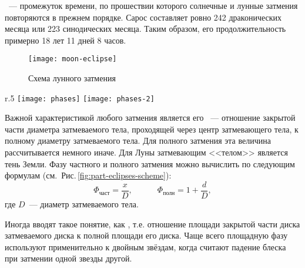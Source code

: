 ~--- промежуток  времени, по прошествии которого солнечные и 
лунные затмения повторяются в прежнем порядке. Сарос составляет ровно 242 драконических месяца или 223 синодических месяца. Таким образом, его продолжительность примерно 18 лет 11 дней 8 часов.

\begin{figure}[h!]
\centering
\texttt{[image: moon-eclipse]}
\caption{Схема лунного затмения}
\label{fig:moon-eclipse-scheme}
\end{figure}

\begin{wrapfigure}[9]{r}{.5\tw}
	\centering
	\vspace{-1pc}
	\texttt{[image: phases]}
	\hfill
	\texttt{[image: phases-2]}
	\caption{Частное и полное затмение}
	\label{fig:part-eclipses-scheme}
\end{wrapfigure}
Важной характеристикой любого затмения является его ~--- отношение закрытой части диаметра затмеваемого тела, проходящей через центр затмевающего тела, к полному диаметру затмеваемого тела. Для полного затмения эта величина рассчитывается немного иначе. Для Луны затмевающим <<телом>> является тень Земли. Фазу частного и полного затмения можно вычислить по следующим формулам (см.~Рис.\,\ref{fig:part-eclipses-scheme}):\begin{equation}
\Phi_{\text{част}} = \frac{x}{D}, \quad \quad \quad \Phi_{\text{полн}} = 1 + \frac{d}{D},
\end{equation}
где $D$~--- диаметр затмеваемого тела.

Иногда вводят такое понятие, как , т.е. отношение площади закрытой части диска затмеваемого диска к полной площади его диска. Чаще всего  площадную фазу используют применительно к двойным звёздам, когда считают падение блеска при затмении одной звезды другой.
